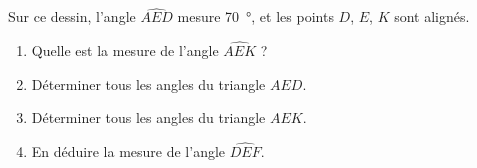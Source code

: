 
\begin{exercice}\label{exo2smath-0327}


    \begin{multicols}{2}

    Sur ce dessin, l'angle \( \widehat{AED}\) mesure \SI{70}{\degree}, et les points \( D\), \( E\), \( K\) sont alignés.
    \begin{enumerate}
        \item
            Quelle est la mesure de l'angle \( \widehat{AEK}\) ?
        \item
            Déterminer tous les angles du triangle \( AED\).
        \item
            Déterminer tous les angles du triangle \( AEK\).
        \item
            En déduire la mesure de l'angle \( \widehat{DEF}\).
    \end{enumerate}

\columnbreak

\begin{center}

\end{center}

    \end{multicols}

\end{exercice}
